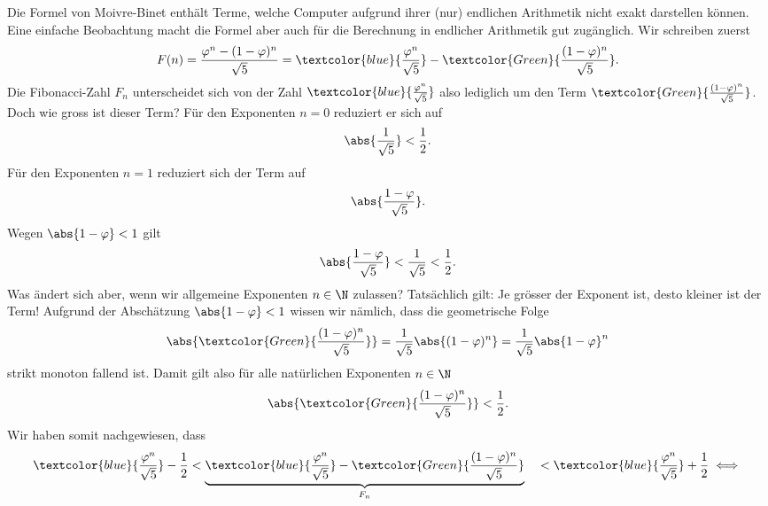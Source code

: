 \begin{myremark}\label{mybemerkung:moivre}
	Die Formel von Moivre-Binet enthält Terme, welche Computer aufgrund ihrer (nur) endlichen Arithmetik nicht exakt darstellen können. Eine einfache Beobachtung macht die Formel aber auch für die Berechnung in endlicher Arithmetik gut zugänglich. Wir schreiben zuerst
	\begin{align*}
		F(n) = \frac{\varphi^n - (1-\varphi)^n}{\sqrt{5}} = \textcolor{blue}{\frac{\varphi^n}{\sqrt{5}}} - \textcolor{Green}{\frac{(1-\varphi)^n}{\sqrt{5}}}.
	\end{align*}
	Die Fibonacci-Zahl $F_n$ unterscheidet sich von der Zahl $\textcolor{blue}{\frac{\varphi^n}{\sqrt{5}}}$ also lediglich um den Term $\textcolor{Green}{\frac{(1-\varphi)^n}{\sqrt{5}}}$. Doch wie gross ist dieser Term? Für den Exponenten $n=0$ reduziert er sich auf
	\begin{align*}
		\abs{\frac{1}{\sqrt{5}}} < \frac{1}{2}.
	\end{align*}
	Für den Exponenten $n=1$ reduziert sich der Term auf
	\begin{align*}
		\abs{\frac{1-\varphi}{\sqrt{5}}}.
	\end{align*}
	Wegen $\abs{1-\varphi} < 1$ gilt
	\begin{align*}
		\abs{\frac{1-\varphi}{\sqrt{5}}} < \frac{1}{\sqrt{5}} < \frac{1}{2}.
	\end{align*}
	Was ändert sich aber, wenn wir allgemeine Exponenten $n\in\N$ zulassen? Tatsächlich gilt: Je grösser der Exponent ist, desto kleiner ist der Term! Aufgrund der Abschätzung $\abs{1-\varphi} < 1$ wissen wir nämlich, dass die geometrische Folge
	\begin{align*}
		\abs{\textcolor{Green}{\frac{(1-\varphi)^n}{\sqrt{5}}}} = \frac{1}{\sqrt{5}}\abs{(1-\varphi)^n} = \frac{1}{\sqrt{5}}\abs{1-\varphi}^n
	\end{align*}
	strikt monoton fallend ist. Damit gilt also für alle natürlichen Exponenten $n\in\N$
	\begin{align*}
		\abs{\textcolor{Green}{\frac{(1-\varphi)^n}{\sqrt{5}}}} < \frac{1}{2}.
	\end{align*}
	Wir haben somit nachgewiesen, dass
	\begin{alignat*}{2}
		\textcolor{blue}{\frac{\varphi^n}{\sqrt{5}}} - \frac{1}{2} & < \underbrace{\textcolor{blue}{\frac{\varphi^n}{\sqrt{5}}} - \textcolor{Green}{\frac{(1-\varphi)^n}{\sqrt{5}}}}_{F_n} &  & < \textcolor{blue}{\frac{\varphi^n}{\sqrt{5}}} + \frac{1}{2} \iff \\

\end{alignat*}
\end{myremark}
